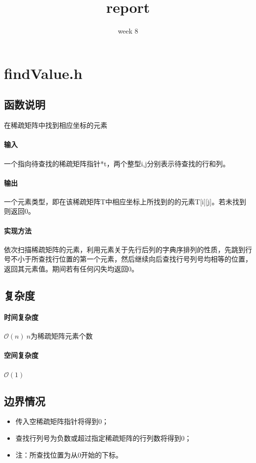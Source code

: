 \documentclass{homework}
\title{report}
\subtitle{week 8}
\begin{document}
\maketitle
\section{findValue.h}
\subsection{函数说明}
在稀疏矩阵中找到相应坐标的元素
\paragraph{输入}
一个指向待查找的稀疏矩阵指针*t，两个整型i,j分别表示待查找的行和列。
\paragraph{输出}
一个元素类型，即在该稀疏矩阵T中相应坐标上所找到的的元素T[i][j]。若未找到则返回0。
\paragraph{实现方法}
依次扫描稀疏矩阵的元素，利用元素关于先行后列的字典序排列的性质，先跳到行号不小于所查找行位置的第一个元素，然后继续向后查找行号列号均相等的位置，返回其元素值。期间若有任何闪失均返回0。
\subsection{复杂度}
\paragraph{时间复杂度}
$\mathcal{O}(n) ~ n$为稀疏矩阵元素个数
\paragraph{空间复杂度}
$\mathcal{O}(1)$
\subsection{边界情况}
\begin{itemize}
    \item 传入空稀疏矩阵指针将得到0；
    \item 查找行列号为负数或超过指定稀疏矩阵的行列数将得到0；
    \item 注：所查找位置为从0开始的下标。
\end{itemize}
\end{document}
